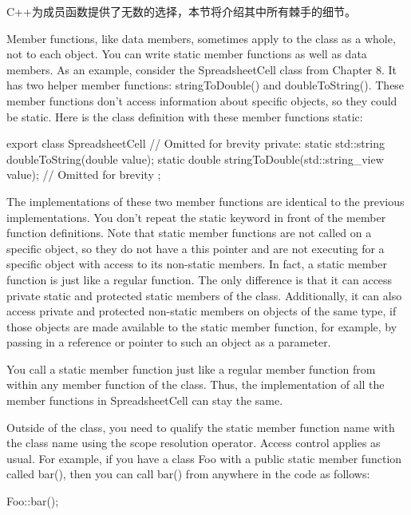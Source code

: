 
C++为成员函数提供了无数的选择，本节将介绍其中所有棘手的细节。


Member functions, like data members, sometimes apply to the class as a whole, not to each object. You can write static member functions as well as data members. As an example, consider the SpreadsheetCell class from Chapter 8. It has two helper member functions: stringToDouble() and doubleToString(). These member functions don’t access information about specific objects, so they could be static. Here is the class definition with these member functions static:

\begin{cpp}
export class SpreadsheetCell
{
    // Omitted for brevity
    private:
        static std::string doubleToString(double value);
        static double stringToDouble(std::string_view value);
        // Omitted for brevity
};
\end{cpp}

The implementations of these two member functions are identical to the previous implementations. You don’t repeat the static keyword in front of the member function definitions. Note that static member functions are not called on a specific object, so they do not have a this pointer and are not executing for a specific object with access to its non-static members. In fact, a static member function is just like a regular function. The only difference is that it can access private static and protected static members of the class. Additionally, it can also access private and protected non-static members on objects of the same type, if those objects are made available to the static member function, for example, by passing in a reference or pointer to such an object as a parameter.

You call a static member function just like a regular member function from within any member function of the class. Thus, the implementation of all the member functions in SpreadsheetCell can stay the same.

Outside of the class, you need to qualify the static member function name with the class name using the scope resolution operator. Access control applies as usual. For example, if you have a class Foo with a public static member function called bar(), then you can call bar() from anywhere in the code as follows:

\begin{cpp}
Foo::bar();
\end{cpp}

